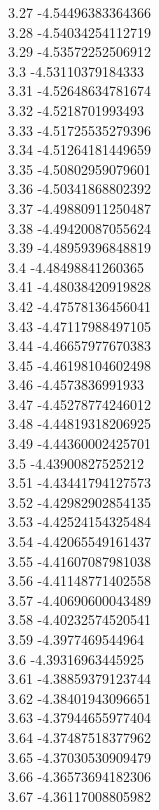 {3.27	-4.54496383364366\\
3.28	-4.54034254112719\\
3.29	-4.53572252506912\\
3.3	-4.53110379184333\\
3.31	-4.52648634781674\\
3.32	-4.5218701993493\\
3.33	-4.51725535279396\\
3.34	-4.51264181449659\\
3.35	-4.50802959079601\\
3.36	-4.50341868802392\\
3.37	-4.49880911250487\\
3.38	-4.49420087055624\\
3.39	-4.48959396848819\\
3.4	-4.48498841260365\\
3.41	-4.48038420919828\\
3.42	-4.47578136456041\\
3.43	-4.47117988497105\\
3.44	-4.46657977670383\\
3.45	-4.46198104602498\\
3.46	-4.4573836991933\\
3.47	-4.45278774246012\\
3.48	-4.44819318206925\\
3.49	-4.44360002425701\\
3.5	-4.43900827525212\\
3.51	-4.43441794127573\\
3.52	-4.42982902854135\\
3.53	-4.42524154325484\\
3.54	-4.42065549161437\\
3.55	-4.41607087981038\\
3.56	-4.41148771402558\\
3.57	-4.40690600043489\\
3.58	-4.40232574520541\\
3.59	-4.3977469544964\\
3.6	-4.39316963445925\\
3.61	-4.38859379123744\\
3.62	-4.38401943096651\\
3.63	-4.37944655977404\\
3.64	-4.37487518377962\\
3.65	-4.37030530909479\\
3.66	-4.36573694182306\\
3.67	-4.36117008805982\\
}
